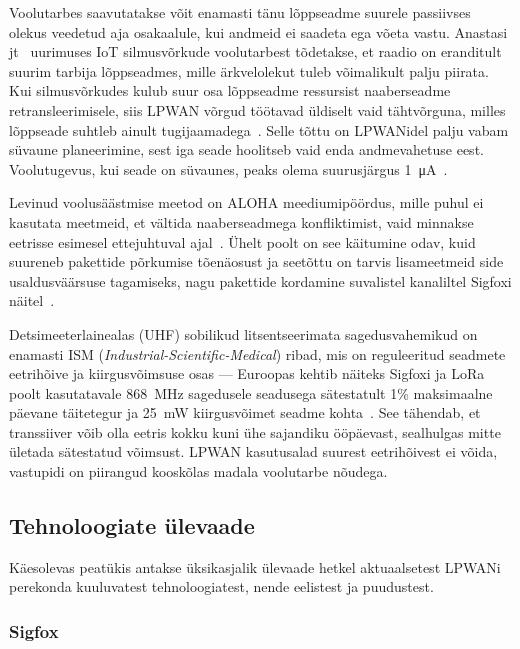 \documentclass[12pt]{article}
\begin{document}
    Voolutarbes saavutatakse võit enamasti tänu lõppseadme suurele passiivses olekus veedetud aja osakaalule, kui andmeid ei saadeta ega võeta vastu.
    Anastasi jt~\cite{anastasi} uurimuses IoT silmusvõrkude voolutarbest tõdetakse, et raadio on eranditult suurim tarbija lõppseadmes, mille ärkvelolekut tuleb võimalikult palju piirata.
    Kui silmusvõrkudes kulub suur osa lõppseadme ressursist naaberseadme retransleerimisele, siis LPWAN võrgud töötavad üldiselt vaid tähtvõrguna, milles lõppseade suhtleb ainult tugijaamadega~\cite{centenaro}.
    Selle tõttu on LPWANidel palju vabam süvaune planeerimine, sest iga seade hoolitseb vaid enda andmevahetuse eest. Voolutugevus, kui seade on süvaunes, peaks olema suurusjärgus \SI{1}{\micro\ampere}~\cite{goursaud}.

    Levinud voolusäästmise meetod on ALOHA meediumipöördus, mille puhul ei kasutata meetmeid, et vältida naaberseadmega konfliktimist, vaid minnakse eetrisse esimesel ettejuhtuval ajal~\cite{raza}.
    Ühelt poolt on see käitumine odav, kuid suureneb pakettide põrkumise tõenäosust ja seetõttu on tarvis lisameetmeid side usaldusväärsuse tagamiseks, nagu pakettide kordamine suvalistel kanaliltel Sigfoxi näitel~\cite{raza}.

    Detsimeeterlainealas (UHF) sobilikud litsentseerimata sagedusvahemikud on enamasti ISM (\textit{Industrial-Scientific-Medical}) ribad, mis on reguleeritud seadmete eetrihõive ja kiirgusvõimsuse osas — Euroopas kehtib näiteks Sigfoxi ja LoRa poolt kasutatavale \SI{868}{\mega\hertz} sagedusele seadusega sätestatult 1\% maksimaalne päevane täitetegur ja \SI{25}{\milli\watt} kiirgusvõimet seadme kohta~\cite{etsi}.
    See tähendab, et transsiiver võib olla eetris kokku kuni ühe sajandiku ööpäevast, sealhulgas mitte ületada sätestatud võimsust.
    LPWAN kasutusalad suurest eetrihõivest ei võida, vastupidi on piirangud kooskõlas madala voolutarbe nõudega.

    \subsection{Tehnoloogiate ülevaade}

    Käesolevas peatükis antakse üksikasjalik ülevaade hetkel aktuaalsetest LPWANi perekonda kuuluvatest tehnoloogiatest, nende eelistest ja puudustest.

    \subsubsection{Sigfox}
\end{document}
